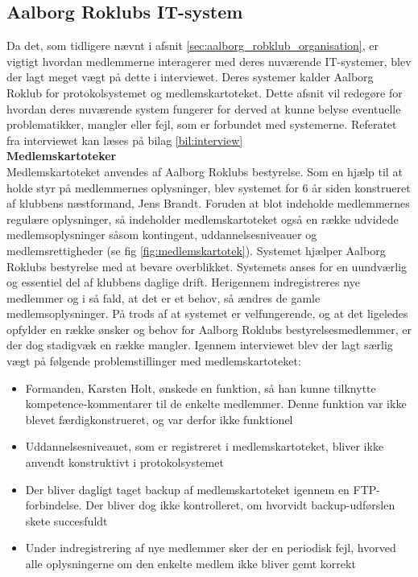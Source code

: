 \subsection{Aalborg Roklubs IT-system}
\label{subsec:itSystem}
Da det, som tidligere nævnt i afsnit \ref{sec:aalborg_robklub_organisation}, er vigtigt hvordan medlemmerne interagerer med deres nuværende IT-systemer, blev der lagt meget vægt på dette i interviewet. Deres systemer kalder Aalborg Roklub for protokolsystemet og medlemskartoteket. Dette afsnit vil redegøre for hvordan deres nuværende system fungerer for derved at kunne belyse eventuelle problematikker, mangler eller fejl, som er forbundet med systemerne. Referatet fra interviewet kan læses på bilag \ref{bil:interview}\\

{\bf{Medlemskartoteker}}\\
Medlemskartoteket anvendes af Aalborg Roklubs bestyrelse. Som en hjælp til at holde styr på medlemmernes oplysninger, blev systemet for 6 år siden konstrueret af klubbens næstformand, Jens Brandt. Foruden at blot indeholde medlemmernes regulære oplysninger, så indeholder medlemskartoteket også en række udvidede medlemsoplysninger såsom kontingent, uddannelsesniveauer og medlemsrettigheder (se fig \ref{fig:medlemskartotek}).
Systemet hjælper Aalborg Roklubs bestyrelse med at bevare overblikket. Systemets anses for en uundværlig og essentiel del af klubbens daglige drift. Herigennem indregistreres nye medlemmer og i så fald, at det er et behov, så ændres de gamle medlemsoplysninger. På trods af at systemet er velfungerende, og at det ligeledes opfylder en række ønsker og behov for Aalborg Roklubs bestyrelsesmedlemmer, er der dog stadigvæk en række mangler. Igennem interviewet blev der lagt særlig vægt på følgende problemstillinger med medlemskartoteket:
\begin{itemize}
\item Formanden, Karsten Holt, ønskede en funktion, så han kunne tilknytte kompetence-kommentarer til de enkelte medlemmer. Denne funktion var ikke blevet færdigkonstrueret, og var derfor ikke funktionel
\item Uddannelsesniveauet, som er registreret i medlemskartoteket, bliver ikke anvendt konstruktivt i protokolsystemet
\item Der bliver dagligt taget backup af medlemskartoteket igennem en FTP-forbindelse. Der bliver dog ikke kontrolleret, om hvorvidt backup-udførslen skete succesfuldt
\item Under indregistrering af nye medlemmer sker der en periodisk fejl, hvorved alle oplysningerne om den enkelte medlem ikke bliver gemt korrekt
\end{itemize}

